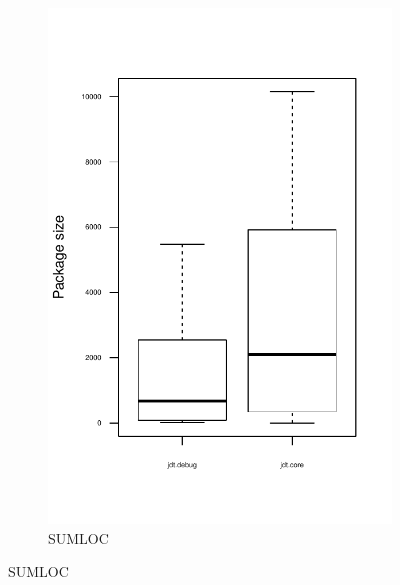 \begin{figure}
\begin{subfigure}[b]{0.48\textwidth}
                \includegraphics[width=\textwidth]{img/package-size-sumloc-zoomed.pdf}
                \caption{SUMLOC}
        \end{subfigure}


\end{figure}

